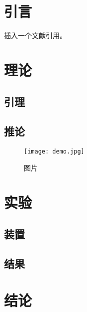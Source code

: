 \section{引言} 

\zhlipsum[1-2] 


插入一个文献引用\cite{zoccoDragFreeControl2020}。


\section{理论} 

\zhlipsum[3]

\subsection{引理}

\zhlipsum[4-7]


\subsection{推论}

\zhlipsum[8-11]

\begin{figure}[!htb]
    \centering
    \texttt{[image: demo.jpg]}
    \caption{图片}
    \label{fig:demo}
\end{figure}


\section{实验} 

\zhlipsum[12]

\subsection{装置}

\zhlipsum[13]

\subsection{结果}

\zhlipsum[14]




\section{结论} 

\zhlipsum[15]
